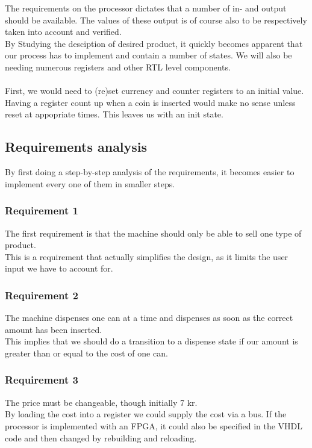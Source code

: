 The requirements on the processor dictates that a number of in- and output should be available. The values of these output is of course also to be respectively taken into account and verified.\\
By Studying the desciption of desired product, it quickly becomes apparent that our process has to implement and contain a number of states. We will also be needing numerous registers and other RTL level components.\\\\
First, we would need to (re)set currency and counter registers to an initial value. Having a register count up when a coin is inserted would make no sense unless reset at appopriate times. This leaves us with an init state.


\subsection{Requirements analysis}
By first doing a step-by-step analysis of the requirements, it becomes easier to implement every one of them in smaller steps.
\subsubsection*{Requirement 1}
The first requirement is that the machine should only be able to sell one type of product.\\
This is a requirement that actually simplifies the design, as it limits the user input we have to account for.

\subsubsection*{Requirement 2}
The machine dispenses one can at a time and dispenses as soon as the correct amount has been inserted.\\
This implies that we should do a transition to a dispense state if our amount is greater than or equal to the cost of one can.

\subsubsection*{Requirement 3}
The price must be changeable, though initially 7 kr.\\
By loading the cost into a register we could supply the cost via a bus. If the processor is implemented with an FPGA, it could also be specified in the VHDL code and then changed by rebuilding and reloading.

